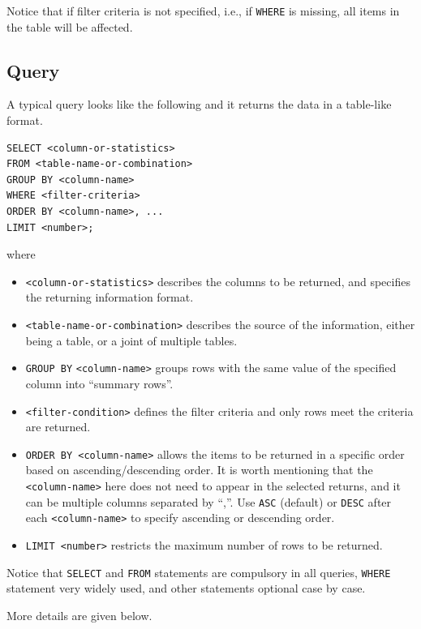 Notice that if filter criteria is not specified, i.e., if \verb|WHERE| is missing, all items in the table will be affected.

\subsection{Query}

A typical query looks like the following and it returns the data in a table-like format.
\begin{lstlisting}
SELECT <column-or-statistics>
FROM <table-name-or-combination>
GROUP BY <column-name>
WHERE <filter-criteria>
ORDER BY <column-name>, ...
LIMIT <number>;
\end{lstlisting}
where
\begin{itemize}
\item \verb|<column-or-statistics>| describes the columns to be returned, and specifies the returning information format.
\item \verb|<table-name-or-combination>| describes the source of the information, either being a table, or a joint of multiple tables.
\item \verb|GROUP BY| \verb|<column-name>| groups rows with the same value of the specified column into ``summary rows''.
\item \verb|<filter-condition>| defines the filter criteria and only rows meet the criteria are returned.
\item \verb|ORDER BY <column-name>| allows the items to be returned in a specific order based on ascending/descending order. It is worth mentioning that the \verb|<column-name>| here does not need to appear in the selected returns, and it can be multiple columns separated by ``,''. Use \verb|ASC| (default) or \verb|DESC| after each \verb|<column-name>| to specify ascending or descending order.
\item \verb|LIMIT <number>| restricts the maximum number of rows to be returned.
\end{itemize}
Notice that \verb|SELECT| and \verb|FROM| statements are compulsory in all queries, \verb|WHERE| statement very widely used, and other statements optional case by case.

More details are given below.

